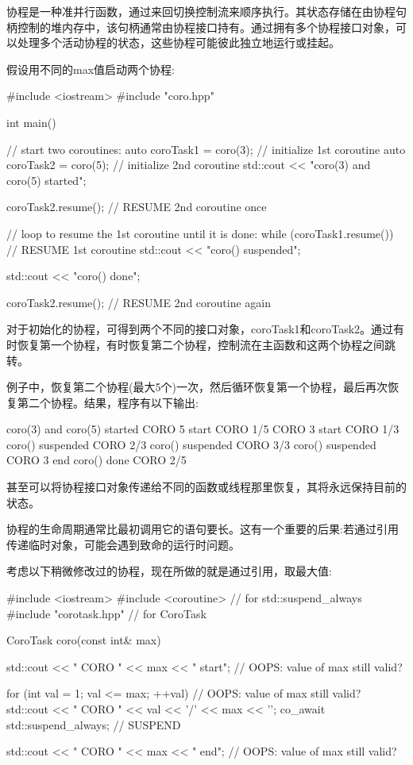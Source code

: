 协程是一种准并行函数，通过来回切换控制流来顺序执行。其状态存储在由协程句柄控制的堆内存中，该句柄通常由协程接口持有。通过拥有多个协程接口对象，可以处理多个活动协程的状态，这些协程可能彼此独立地运行或挂起。

假设用不同的max值启动两个协程:


\begin{cpp}
#include <iostream>
#include "coro.hpp"

int main()
{
	// start two coroutines:
	auto coroTask1 = coro(3); // initialize 1st coroutine
	auto coroTask2 = coro(5); // initialize 2nd coroutine
	std::cout << "coro(3) and coro(5) started\n";

	coroTask2.resume(); // RESUME 2nd coroutine once

	// loop to resume the 1st coroutine until it is done:
	while (coroTask1.resume()) { // RESUME 1st coroutine
		std::cout << "coro() suspended\n";
	}

	std::cout << "coro() done\n";

	coroTask2.resume(); // RESUME 2nd coroutine again
}
\end{cpp}

对于初始化的协程，可得到两个不同的接口对象，coroTask1和coroTask2。通过有时恢复第一个协程，有时恢复第二个协程，控制流在主函数和这两个协程之间跳转。

例子中，恢复第二个协程(最大5个)一次，然后循环恢复第一个协程，最后再次恢复第二个协程。结果，程序有以下输出:

\begin{shell}
coro(3) and coro(5) started
         CORO 5 start
         CORO 1/5
         CORO 3 start
         CORO 1/3
coro() suspended
         CORO 2/3
coro() suspended
         CORO 3/3
coro() suspended
         CORO 3 end
coro() done
         CORO 2/5
\end{shell}

甚至可以将协程接口对象传递给不同的函数或线程那里恢复，其将永远保持目前的状态。


协程的生命周期通常比最初调用它的语句要长。这有一个重要的后果:若通过引用传递临时对象，可能会遇到致命的运行时问题。

考虑以下稍微修改过的协程，现在所做的就是通过引用，取最大值:


\begin{cpp}
#include <iostream>
#include <coroutine> // for std::suspend_always{}
#include "corotask.hpp" // for CoroTask

CoroTask coro(const int& max)
{
	std::cout << "   CORO " << max << " start\n"; // OOPS: value of max still valid?

	for (int val = 1; val <= max; ++val) { // OOPS: value of max still valid?
		std::cout << " CORO " << val << '/' << max << '\n';
		co_await std::suspend_always{}; // SUSPEND
	}

	std::cout << " CORO " << max << " end\n"; // OOPS: value of max still valid?
}
\end{cpp}

